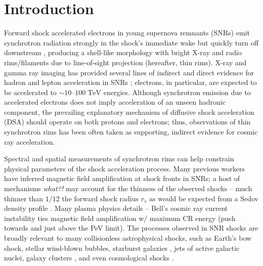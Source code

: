 \documentclass[iop, apj, numberedappendix, twocolappendix]{emulateapj}
\newcommand*{\mt}{\mathrm}
\newcommand*{\unit}[1]{\;\mt{#1}}  %
\newcommand*{\abt}{\mathord{\sim}} %
\begin{document}

\section{Introduction}


Forward shock accelerated electrons in young supernova remnants (SNRs) emit
synchrotron radiation strongly in the shock's immediate wake but quickly turn
off downstream \citep{koyama1995, reynolds1996}, producing a shell-like
morphology with bright X-ray and radio rims/filaments due to line-of-sight
projection (hereafter, thin rims).  X-ray and gamma ray imaging has provided
several lines of indirect and direct evidence for hadron and lepton
acceleration in SNRs \citep{uchiyama2007, aharonian2004, acero2010,
ackermann2013}; electrons, in particular, are expected to be accelerated to
$\abt10$--$100\unit{TeV}$ energies.  Although synchrotron emission due to
accelerated electrons does not imply acceleration of an unseen hadronic
component, the prevailing explanatory mechanism of diffusive shock acceleration
(DSA) should operate on both protons and electrons; thus, observations of thin
synchrotron rims has been often taken as supporting, indirect evidence for
cosmic ray acceleration.  

Spectral and spatial measurements of synchrotron rims can help constrain
physical parameters of the shock acceleration process.  Many previous workers
have inferred magnetic field amplification at shock fronts in SNRs; a host of
mechanisms \emph{what?!} may account for the thinness of the observed
shocks -- much thinner than $1/12$ the forward shock radius $r_s$ as would be
expected from a Sedov density profile .   Many plasma physics details -- Bell's cosmic ray current instability
\citep{bell2001} ties magnetic field amplification w/ maximum CR energy (push
towards and just above the PeV limit).  The processes observed in SNR shocks
are broadly relevant to many collisionless astrophysical shocks, such as
Earth's bow shock, stellar wind-blown bubbles, starburst galaxies
\citep{heckman1990}, jets of active galactic nuclei, galaxy clusters
\citep{van-weeren2010}, and even cosmological shocks \citep{miniati2000,
ryu2008}.
\end{document}
